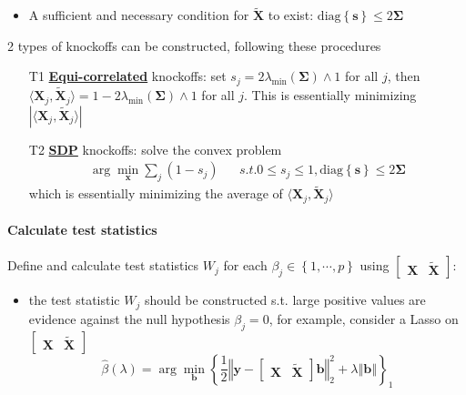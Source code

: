 \documentclass[twoside]{article}
\begin{document}
\begin{itemize}
\begin{itemize}
        \item A sufficient and necessary condition for $\tilde{\mathbf{X}}$ to exist: $\mathrm{diag}\left\{\mathbf{s}\right\} \leq 2\boldsymbol{\Sigma}$
    \end{itemize}
    2 types of knockoffs can be constructed, following these procedures
    \begin{itemize}
        \item[T1] \underline{\textbf{Equi-correlated}} knockoffs: set $s_j=2\lambda_{\min}(\boldsymbol{\Sigma}) \wedge 1$ for all $j$, then $\langle \mathbf{X}_j,\tilde{\mathbf{X}}_j \rangle = 1-2\lambda_{\min}(\boldsymbol{\Sigma}) \wedge 1$ for all $j$. This is essentially minimizing $\left\vert \langle \mathbf{X}_j,\tilde{\mathbf{X}}_j \rangle \right\vert$ 
        \item[T2] \underline{\textbf{SDP}} knockoffs: solve the convex problem \begin{align*}
            \arg\min_{\mathbf{x}} \sum_j (1-s_j) & & s.t. 0 \leq s_j \leq 1, \mathrm{diag}\left\{ \mathbf{s}\right\}\leq 2\boldsymbol{\Sigma}
        \end{align*}
        which is essentially minimizing the average of $ \langle \mathbf{X}_j,\tilde{\mathbf{X}}_j \rangle $ 
    \end{itemize}
\end{itemize}

\paragraph{Calculate test statistics} Define and calculate test statistics $W_j$ for each $\beta_j\in\left\{ 1,\cdots,p \right\}$ using $\begin{bmatrix} \mathbf{X} & \tilde{\mathbf{X}} \end{bmatrix}$:
\begin{itemize}
    \item the test statistic $W_j$ should be constructed s.t. large positive values are evidence against the null hypothesis $\beta_j =0$, for example, consider a Lasso on $\begin{bmatrix} \mathbf{X} & \tilde{\mathbf{X}} \end{bmatrix}$ $$ \hat{\beta}(\lambda) = \arg\min_{\mathbf{b}}\left\{ \frac{1}{2}\left\Vert \mathbf{y}-\begin{bmatrix} \mathbf{X} & \tilde{\mathbf{X}} \end{bmatrix} \mathbf{b} \right\Vert^2_2 + \lambda\left\Vert \mathbf{b} \right\Vert \right\} _1 $$
\end{itemize}

\newpage


\end{document}
